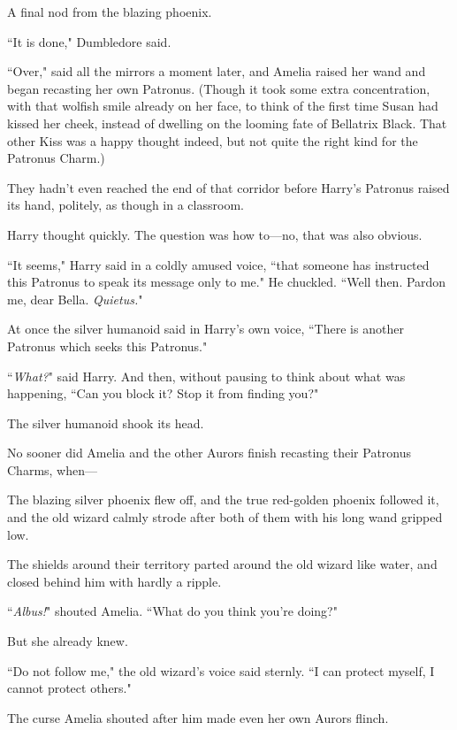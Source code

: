 A final nod from the blazing phoenix.

``It is done," Dumbledore said.

``Over," said all the mirrors a moment later, and Amelia raised her wand and began recasting her own Patronus. (Though it took some extra concentration, with that wolfish smile already on her face, to think of the first time Susan had kissed her cheek, instead of dwelling on the looming fate of Bellatrix Black. That other Kiss was a happy thought indeed, but not quite the right kind for the Patronus Charm.)

\later

They hadn't even reached the end of that corridor before Harry's Patronus raised its hand, politely, as though in a classroom.

Harry thought quickly. The question was how to---no, that was also obvious.

``It seems," Harry said in a coldly amused voice, ``that someone has instructed this Patronus to speak its message only to me." He chuckled. ``Well then. Pardon me, dear Bella. \emph{Quietus.}"

At once the silver humanoid said in Harry's own voice, ``There is another Patronus which seeks this Patronus."

``\emph{What?}" said Harry. And then, without pausing to think about what was happening, ``Can you block it? Stop it from finding you?"

The silver humanoid shook its head.

\later

No sooner did Amelia and the other Aurors finish recasting their Patronus Charms, when---

The blazing silver phoenix flew off, and the true red-golden phoenix followed it, and the old wizard calmly strode after both of them with his long wand gripped low.

The shields around their territory parted around the old wizard like water, and closed behind him with hardly a ripple.

``\emph{Albus!}" shouted Amelia. ``What do you think you're doing?"

But she already knew.

``Do not follow me," the old wizard's voice said sternly. ``I can protect myself, I cannot protect others."

The curse Amelia shouted after him made even her own Aurors flinch.

\later

